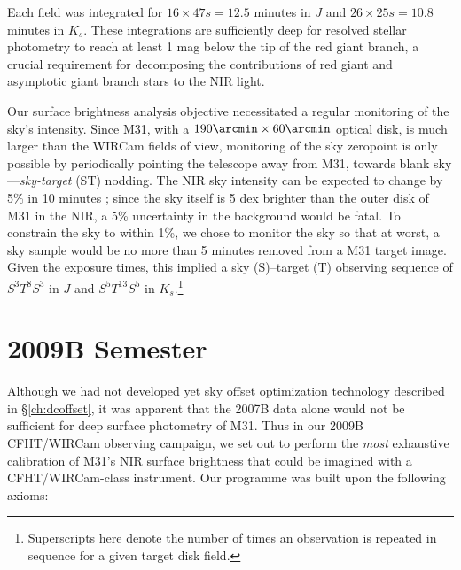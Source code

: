 \documentclass[iop]{emulateapj}
\begin{document}
Each field was integrated for $16\times 47 s = 12.5$ minutes in $J$ and $26\times 25 s = 10.8$ minutes in $K_s$. These integrations are sufficiently deep for resolved stellar photometry to reach at least 1 mag below the tip of the red giant branch, a crucial requirement for decomposing the contributions of red giant and asymptotic giant branch stars to the NIR light.

Our surface brightness analysis objective necessitated a regular monitoring of the sky's intensity. Since M31, with a $190\arcmin \times 60\arcmin$ optical disk, is much larger than the WIRCam fields of view, monitoring of the sky zeropoint is only possible by periodically pointing the telescope away from M31, towards blank sky---\emph{sky-target} (ST) nodding. The NIR sky intensity can be expected to change by 5\% in 10 minutes \citep{Adams:1996,Vaduvescu:2004}; since the sky itself is 5 dex brighter than the outer disk of M31 in the NIR, a 5\% uncertainty in the background would be fatal. To constrain the sky to within 1\%, we chose to monitor the sky so that at worst, a sky sample would be no more than 5 minutes removed from a M31 target image. Given the exposure times, this implied a sky (S)--target (T) observing sequence of $S^3T^8S^3$ in $J$ and $S^5T^{13}S^5$ in $K_s$.\footnote{Superscripts here denote the number of times an observation is repeated in sequence for a given target disk field.}

\section{2009B Semester}
\label{sec:obs9}

Although we had not developed yet sky offset optimization technology described in \S \ref{ch:dcoffset}, it was apparent that the 2007B data alone would not be sufficient for deep surface photometry of M31. Thus in our 2009B CFHT/WIRCam observing campaign, we set out to perform the \emph{most} exhaustive calibration of M31's NIR surface brightness that could be imagined with a CFHT/WIRCam-class instrument. Our programme was built upon the following axioms:
\end{document}
